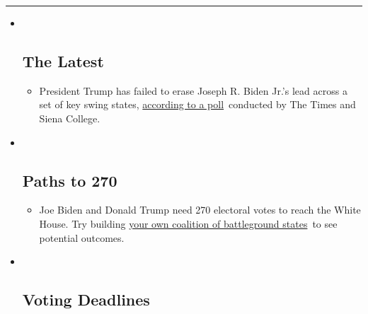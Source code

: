 \begin{center}\rule{0.5\linewidth}{\linethickness}\end{center}

\begin{itemize}
\item ~
  \hypertarget{the-latest}{%
  \subsection{The Latest}\label{the-latest}}

  \begin{itemize}
  \item
    President Trump has failed to erase Joseph R. Biden Jr.'s lead
    across a set of key swing states,
    \href{https://www.nytimes3xbfgragh.onion/2020/09/12/us/politics/biden-trump-poll-wisconsin-minnesota.html?action=click\&pgtype=Article\&state=default\&region=BELOW_MAIN_CONTENT\&context=storylines_guide}{according
    to a poll}~conducted by The Times and Siena College.
  \end{itemize}
\item ~
  \hypertarget{paths-to-270}{%
  \subsection{Paths to 270}\label{paths-to-270}}

  \begin{itemize}
  \item
    Joe Biden and Donald Trump need 270 electoral votes to reach the
    White House. Try building
    \href{https://www.nytimes3xbfgragh.onion/interactive/2020/us/elections/election-states-biden-trump.html?action=click\&pgtype=Article\&state=default\&region=BELOW_MAIN_CONTENT\&context=storylines_guide}{your
    own coalition of battleground states}~to see potential outcomes.
  \end{itemize}
\item ~
  \hypertarget{voting-deadlines}{%
  \subsection{Voting Deadlines}\label{voting-deadlines}}


\end{itemize}
